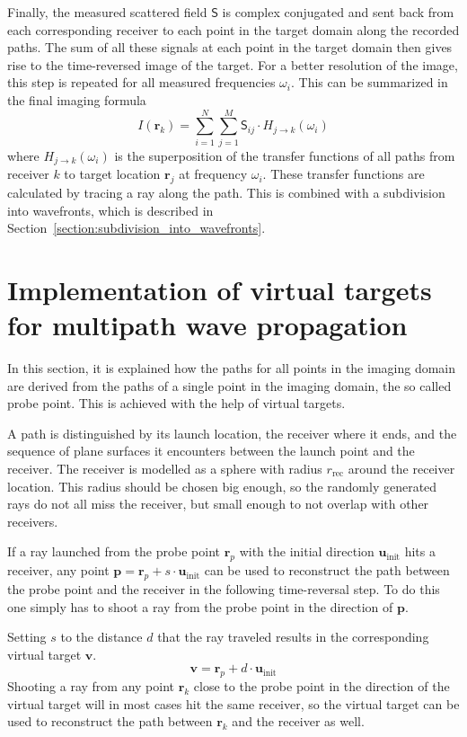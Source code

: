Finally, the measured scattered field \(\mathsf{S}\) is complex conjugated and sent back from each corresponding receiver to each point in the target domain along the recorded paths.
The sum of all these signals at each point in the target domain then gives rise to the time-reversed image of the target.
For a better resolution of the image, this step is repeated for all measured frequencies \(\omega_i\).
This can be summarized in the final imaging formula
\begin{equation}
    I(\mathbf{r}_k) = \sum_{i=1}^{N} \sum_{j=1}^{M} \mathsf{S}_{ij} \cdot H_{j \rightarrow k}(\omega_i)
\end{equation}
where \(H_{j \rightarrow k}(\omega_i )\) is the superposition of the transfer functions of all paths from receiver \(k\) to target location \(\mathbf{r}_j\) at frequency \(\omega_i\).
These transfer functions are calculated by tracing a ray along the path.
This is combined with a subdivision into wavefronts, which is described in Section~\ref{section:subdivision_into_wavefronts}.


\section{Implementation of virtual targets for multipath wave propagation}\label{section:virtual_targets}
In this section, it is explained how the paths for all points in the imaging domain are derived from the paths of a single point in the imaging domain, the so called probe point.
This is achieved with the help of virtual targets.

A path is distinguished by its launch location, the receiver where it ends, and the sequence of plane surfaces it encounters between the launch point and the receiver.
The receiver is modelled as a sphere with radius \(r_{\text{rec}}\) around the receiver location.
This radius should be chosen big enough, so the randomly generated rays do not all miss the receiver, but small enough to not overlap with other receivers.

If a ray launched from the probe point \(\mathbf{r}_p\) with the initial direction \(\mathbf{u}_{\text{init}}\) hits a receiver, any point \(\mathbf{p} = \mathbf{r}_p + s \cdot \mathbf{u}_{\text{init}}\) can be used to reconstruct the path between the probe point and the receiver in the following time-reversal step.
To do this one simply has to shoot a ray from the probe point in the direction of \(\mathbf{p}\).

Setting \(s\) to the distance \(d\) that the ray traveled results in the corresponding virtual target \(\mathbf{v}\).
\begin{equation}\label{eq:visual_target}
    \mathbf{v} = \mathbf{r}_p + d \cdot \mathbf{u}_{\text{init}}
\end{equation}
Shooting a ray from any point \(\mathbf{r}_k\) close to the probe point in the direction of the virtual target will in most cases hit the same receiver, so the virtual target can be used to reconstruct the path between \(\mathbf{r}_k\) and the receiver as well.


